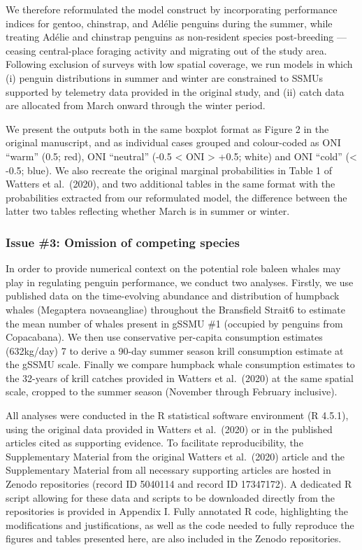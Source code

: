 \documentclass[]{elsarticle} %
\begin{document}
We therefore reformulated the model construct by incorporating
performance indices for gentoo, chinstrap, and Adélie penguins during
the summer, while treating Adélie and chinstrap penguins as non-resident
species post-breeding --- ceasing central-place foraging activity and
migrating out of the study area. Following exclusion of surveys with low
spatial coverage, we run models in which (i) penguin distributions in
summer and winter are constrained to SSMUs supported by telemetry data
provided in the original study, and (ii) catch data are allocated from
March onward through the winter period.

We present the outputs both in the same boxplot format as Figure 2 in
the original manuscript, and as individual cases grouped and
colour-coded as ONI ``warm'' (0.5; red), ONI ``neutral'' (-0.5
\textless{} ONI \textgreater{} +0.5; white) and ONI ``cold''
(\textless{} -0.5; blue). We also recreate the original marginal
probabilities in Table 1 of Watters et al.~(2020), and two additional
tables in the same format with the probabilities extracted from our
reformulated model, the difference between the latter two tables
reflecting whether March is in summer or winter.

\subsubsection{Issue \#3: Omission of competing
species}\label{issue-3-omission-of-competing-species}

In order to provide numerical context on the potential role baleen
whales may play in regulating penguin performance, we conduct two
analyses. Firstly, we use published data on the time-evolving abundance
and distribution of humpback whales (Megaptera novaeangliae) throughout
the Bransfield Strait6 to estimate the mean number of whales present in
gSSMU \#1 (occupied by penguins from Copacabana). We then use
conservative per-capita consumption estimates (632kg/day) 7 to derive a
90-day summer season krill consumption estimate at the gSSMU scale.
Finally we compare humpback whale consumption estimates to the 32-years
of krill catches provided in Watters et al.~(2020) at the same spatial
scale, cropped to the summer season (November through February
inclusive).

All analyses were conducted in the R statistical software environment (R
4.5.1), using the original data provided in Watters et al.~(2020) or in
the published articles cited as supporting evidence. To facilitate
reproducibility, the Supplementary Material from the original Watters et
al.~(2020) article and the Supplementary Material from all necessary
supporting articles are hosted in Zenodo repositories (record ID 5040114
and record ID 17347172). A dedicated R script allowing for these data
and scripts to be downloaded directly from the repositories is provided
in Appendix I. Fully annotated R code, highlighting the modifications
and justifications, as well as the code needed to fully reproduce the
figures and tables presented here, are also included in the Zenodo
repositories.
\end{document}
